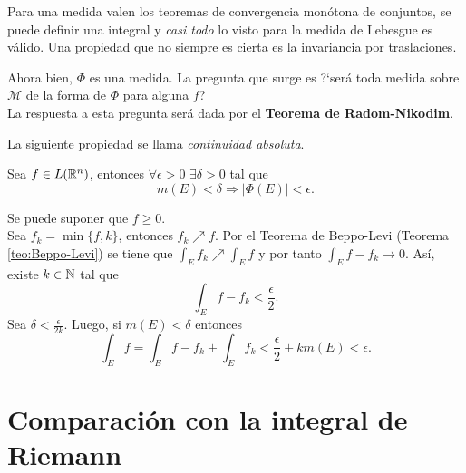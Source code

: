                     
                    Para una medida valen los teoremas de convergencia mon\'otona de conjuntos, se puede definir una integral y \emph{casi todo} lo visto para la medida de Lebesgue es v\'alido. Una propiedad que no siempre es cierta es la invariancia por traslaciones.
                    
                    Ahora bien,  $\Phi$ es una medida. 
                    La pregunta que surge es ?`ser\'a toda medida sobre
                    $\mathcal{M}$ de la forma de $\Phi$ para alguna $f$?\\
                    La respuesta a esta pregunta ser\'a dada por el \textbf{Teorema de Radom-Nikodim}.
                    
                    
                    La siguiente propiedad se llama \emph{continuidad absoluta}.
                    
                    \begin{teorema}{}
                    Sea $f \in L(\mathbb{R}^n)$, entonces $\forall \epsilon>0$ \;$\exists \delta >0$ tal que 
                    \[
                    m(E)<\delta \Longrightarrow |\Phi(E)|<\epsilon.
                    \]
                    \end{teorema}
                    
                    \begin{demo}
                    Se puede suponer que $f\geq 0$. \\
                    Sea $f_k=\min\{f,k\}$, entonces $f_k \nearrow f$.
                    Por el Teorema de Beppo-Levi (Teorema \ref{teo:Beppo-Levi}) se tiene que 
                    $\int_E f_k \nearrow \int_E f$ y por tanto
                    $
                    \int_E f-f_k \to 0.
                    $
                    As\'i, existe $k \in \mathbb{N}$ tal que 
                    \[
                    \int_E f-f_k < \frac{\epsilon}{2}.
                    \]
                    Sea $\delta <\frac{\epsilon}{2k}$. Luego, si $m(E)<\delta$ entonces 
                    \[
                    \int_E f =\int_E f-f_k +\int_E f_k <\frac{\epsilon}{2}+km(E)<\epsilon. 
                    \]
                    \end{demo}
                    
                    \section{Comparaci\'on con la integral de Riemann}
                    
